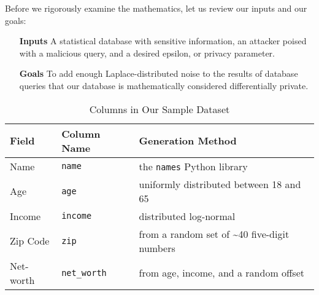 \documentclass[conference,11pt]{IEEEtran}
\begin{document}
Before we rigorously examine the mathematics, let us review our inputs and our
goals:

\begin{itemize}[leftmargin=4em]
    \item [\textbf{Inputs}] A statistical database with sensitive information,
        an attacker poised with a malicious query, and a desired epsilon, or
        privacy parameter.

    \item [\textbf{Goals}] To add enough Laplace-distributed noise to the
        results of database queries that our database is mathematically
        considered differentially private.
\end{itemize}

\begin{table*}[h]
    \caption{Columns in Our Sample Dataset}\label{tab:cols}
    \centering
    \begin{tabular}{l | l | l}
        \textbf{Field} & \textbf{Column Name} & \textbf{Generation Method} \\
        \hline
        Name & \texttt{name} & the \texttt{names} Python library \\
        Age & \texttt{age} & uniformly distributed between 18 and 65 \\
        Income & \texttt{income} & distributed log-normal \\
        Zip Code & \texttt{zip} & from a random set of \textasciitilde40
            five-digit numbers \\
        Net-worth & \texttt{net\_worth} & from age, income, and a random offset
    \end{tabular}
\end{table*}
\end{document}
